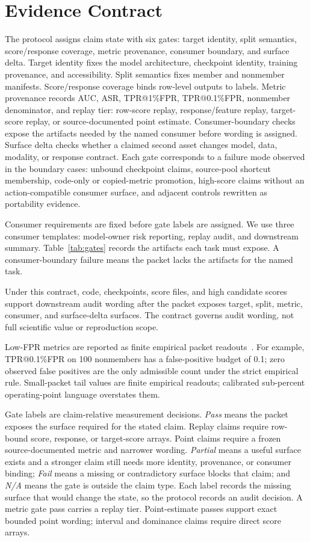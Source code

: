 \documentclass[10pt,conference]{IEEEtran}
\begin{document}
\section{Evidence Contract}

The protocol assigns claim state with six gates: target identity, split
semantics, score/response coverage, metric provenance, consumer boundary, and
surface delta. Target identity fixes the model architecture, checkpoint
identity, training provenance, and accessibility. Split semantics fixes member
and nonmember manifests. Score/response coverage binds row-level outputs to
labels. Metric provenance records AUC, ASR, TPR@1\%FPR, TPR@0.1\%FPR,
nonmember denominator, and replay tier: row-score replay, response/feature
replay, target-score replay, or source-documented point estimate.
Consumer-boundary checks expose the artifacts needed by the named consumer
before wording is assigned. Surface delta checks whether a claimed second asset
changes model, data, modality, or response contract.
Each gate corresponds to a failure mode observed in the boundary cases: unbound
checkpoint claims, source-pool shortcut membership, code-only or copied-metric
promotion, high-score claims without an action-compatible consumer surface, and
adjacent controls rewritten as portability evidence.

Consumer requirements are fixed before gate labels are assigned. We use three
consumer templates: model-owner risk reporting, replay audit, and downstream
summary. Table~\ref{tab:gates} records the artifacts each task must expose.
A consumer-boundary failure means the packet lacks the artifacts for the named
task.

Under this contract, code, checkpoints, score files, and high candidate scores
support downstream audit wording after the packet exposes target, split, metric,
consumer, and surface-delta surfaces. The contract governs audit wording, not
full scientific value or reproduction scope.

Low-FPR metrics are reported as finite empirical packet readouts~\cite{carlini2022firstprinciples}. For example,
TPR@0.1\%FPR on 100 nonmembers has a false-positive budget of 0.1; zero
observed false positives are the only admissible count under the strict empirical
rule.
Small-packet tail values are finite empirical readouts; calibrated sub-percent
operating-point language overstates them.

Gate labels are claim-relative measurement decisions. \emph{Pass} means the packet
exposes the surface required for the stated claim. Replay claims require
row-bound score, response, or target-score arrays. Point claims require a
frozen source-documented metric and narrower wording. \emph{Partial} means a
useful surface exists and a stronger claim still needs more identity,
provenance, or consumer binding; \emph{Fail} means a missing or contradictory
surface blocks that claim; and \emph{N/A} means the gate is outside the claim
type. Each label records the missing surface that would change the state, so
the protocol records an audit decision.
A metric gate pass carries a replay tier. Point-estimate passes support exact
bounded point wording; interval and dominance claims require direct score
arrays.
\end{document}

